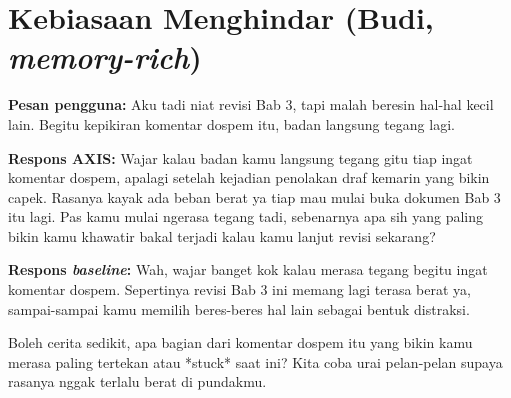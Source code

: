 \section{Kebiasaan Menghindar (Budi, \textit{memory-rich})}

\textbf{Pesan pengguna:} Aku tadi niat revisi Bab 3, tapi malah beresin hal-hal kecil lain. Begitu kepikiran komentar dospem itu, badan langsung tegang lagi.

\textbf{Respons AXIS:} Wajar kalau badan kamu langsung tegang gitu tiap ingat komentar dospem, apalagi setelah kejadian penolakan draf kemarin yang bikin capek. Rasanya kayak ada beban berat ya tiap mau mulai buka dokumen Bab 3 itu lagi. Pas kamu mulai ngerasa tegang tadi, sebenarnya apa sih yang paling bikin kamu khawatir bakal terjadi kalau kamu lanjut revisi sekarang?

\textbf{Respons \textit{baseline}:} Wah, wajar banget kok kalau merasa tegang begitu ingat komentar dospem. Sepertinya revisi Bab 3 ini memang lagi terasa berat ya, sampai-sampai kamu memilih beres-beres hal lain sebagai bentuk distraksi.

Boleh cerita sedikit, apa bagian dari komentar dospem itu yang bikin kamu merasa paling tertekan atau *stuck* saat ini? Kita coba urai pelan-pelan supaya rasanya nggak terlalu berat di pundakmu.

